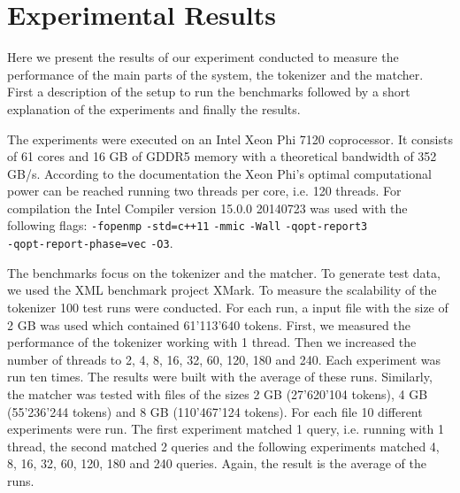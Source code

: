 
\section{Experimental Results}\label{sec:exp}

Here we present the results of our experiment conducted to measure the performance of the main parts of the system, the tokenizer and the matcher. First a description of the setup to run the benchmarks followed by a short explanation of the experiments and finally the results.

 The experiments were executed on an Intel Xeon Phi 7120 coprocessor. It consists of 61 cores and 16 GB of GDDR5 memory with a theoretical bandwidth of 352 GB/s. According to the documentation the Xeon Phi's optimal computational power can be reached running two threads per core, i.e. 120 threads.
For compilation the Intel Compiler version 15.0.0 20140723 was used with the following flags: \verb;-fopenmp; \verb;-std=c++11; \verb;-mmic; \verb;-Wall; \verb;-qopt-report3; \\ \verb;-qopt-report-phase=vec; \verb;-O3;.

The benchmarks focus on the tokenizer and the matcher. To generate test data, we used the XML benchmark project XMark. To measure the scalability of the tokenizer 100 test runs were conducted. For each run, a input file with the size of 2 GB was used which contained 61'113'640 tokens. First, we measured the performance of the tokenizer working with 1 thread. Then we increased the number of threads to 2, 4, 8, 16, 32, 60, 120, 180 and 240. Each experiment was run ten times. The results were built with the average of these runs. Similarly, the matcher was tested with files of the sizes 2 GB (27'620'104 tokens), 4 GB (55'236'244 tokens) and 8 GB (110'467'124 tokens). For each file 10 different experiments were run. The first experiment matched 1 query, i.e. running with 1 thread, the second matched 2 queries and the following experiments matched 4, 8, 16, 32, 60, 120, 180 and 240 queries. Again, the result is the average of the runs.

